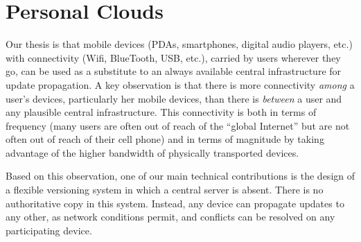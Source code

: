 


\section{Personal Clouds}
\label{sec:model}

Our thesis is that mobile devices (PDAs, smartphones, digital audio
players, etc.) with connectivity (Wifi, BlueTooth, USB, etc.), carried
by users wherever they go, can be used as a substitute to an always
available central infrastructure for update propagation. A key
observation is that there is more connectivity \emph{among} a user's
devices, particularly her mobile devices, than there is \emph{between} a
user and any plausible central infrastructure. This connectivity is both
in terms of frequency (many users are often out of reach of the ``global
Internet'' but are not often out of reach of their cell phone) and in
terms of magnitude by taking advantage of the higher bandwidth of
physically transported devices. 

Based on this observation, one of our main technical contributions is the design of a
flexible versioning system in which a central server is absent.
There is no authoritative copy in this system. 
Instead, any device can propagate updates to any other, as network
conditions permit, and conflicts can be resolved on any participating 
device. 

